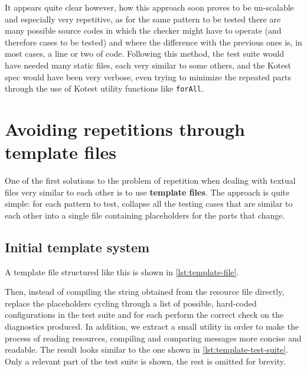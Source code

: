 \documentclass[12pt,a4paper,openright,twoside]{book}
\begin{document}
It appears quite clear however, how this approach soon proves to be un-scalable
and especially very repetitive, as for the same pattern to be tested there are
many possible source codes in which the checker might have to operate (and
therefore cases to be tested) and where the difference with the previous ones
is, in most cases, a line or two of code. 
%
Following this method, the test suite would have needed many static files, each
very similar to some others, and the Kotest spec would have been very verbose,
even trying to minimize the repeated parts through the use of Kotest utility
functions like \lstinline{forAll}.

\section{Avoiding repetitions through template files}

One of the first solutions to the problem of repetition when dealing with
textual files very similar to each other is to use \textbf{template files}. The
approach is quite simple: for each pattern to test, collapse all the testing
cases that are similar to each other into a single file containing placeholders
for the parts that change. 

\subsection{Initial template system}


A template file structured like this is shown in
\cref{lst:template-file}.
%

%
Then, instead of compiling the string obtained from the
resource file directly, replace the placeholders cycling through a list of
possible, hard-coded configurations in the test suite and for each perform the
correct check on the diagnostics produced.
%
In addition, we extract a small utility in order to make the process of reading
resources, compiling and comparing messages more concise and readable. The
result looks similar to the one shown in \cref{lst:template-test-suite}. Only a
relevant part of the test suite is shown, the rest is omitted for brevity.


\end{document}
